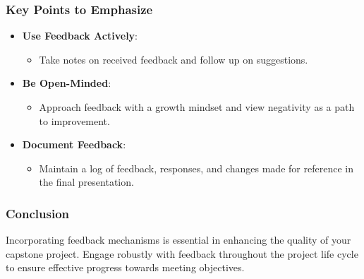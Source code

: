 \documentclass[aspectratio=169]{beamer}
\begin{document}
\begin{frame}[fragile]
    \frametitle{Key Points to Emphasize}
    \begin{itemize}
        \item \textbf{Use Feedback Actively}:
            \begin{itemize}
                \item Take notes on received feedback and follow up on suggestions.
            \end{itemize}
        \item \textbf{Be Open-Minded}:
            \begin{itemize}
                \item Approach feedback with a growth mindset and view negativity as a path to improvement.
            \end{itemize}
        \item \textbf{Document Feedback}:
            \begin{itemize}
                \item Maintain a log of feedback, responses, and changes made for reference in the final presentation.
            \end{itemize}
    \end{itemize}
\end{frame}

\begin{frame}[fragile]
    \frametitle{Conclusion}
    Incorporating feedback mechanisms is essential in enhancing the quality of your capstone project. Engage robustly with feedback throughout the project life cycle to ensure effective progress towards meeting objectives.
\end{frame}
\end{document}
